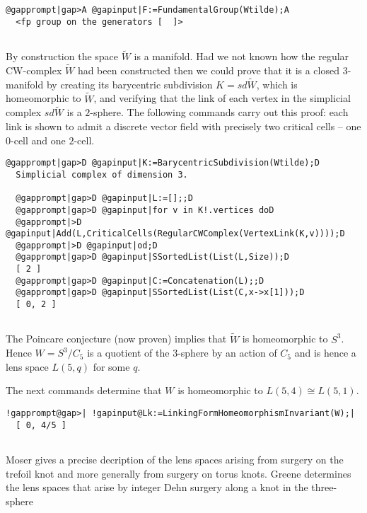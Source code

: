 \documentclass[a4paper,11pt]{report}
\begin{document}
{{\begin{Verbatim}[commandchars=@|A,fontsize=\small,frame=single,label=Example]
  @gapprompt|gap>A @gapinput|F:=FundamentalGroup(Wtilde);A
  <fp group on the generators [  ]>
  
\end{Verbatim}
 By construction the space $\widetilde W$ is a manifold. Had we not known how the regular CW-complex $\widetilde W$ had been constructed then we could prove that it is a closed $3$-manifold by creating its barycentric subdivision $K=sd\widetilde W$, which is homeomorphic to $\widetilde W$, and verifying that the link of each vertex in the simplicial complex $sd\widetilde W$ is a $2$-sphere. The following commands carry out this proof: each link is shown to
admit a discrete vector field with precisely two critical cells -- one $0$-cell and one $2$-cell. 
\begin{Verbatim}[commandchars=@|D,fontsize=\small,frame=single,label=Example]
  @gapprompt|gap>D @gapinput|K:=BarycentricSubdivision(Wtilde);D
  Simplicial complex of dimension 3.
  
  @gapprompt|gap>D @gapinput|L:=[];;D
  @gapprompt|gap>D @gapinput|for v in K!.vertices doD
  @gapprompt|>D @gapinput|Add(L,CriticalCells(RegularCWComplex(VertexLink(K,v))));D
  @gapprompt|>D @gapinput|od;D
  @gapprompt|gap>D @gapinput|SSortedList(List(L,Size));D
  [ 2 ]
  @gapprompt|gap>D @gapinput|C:=Concatenation(L);;D
  @gapprompt|gap>D @gapinput|SSortedList(List(C,x->x[1]));D
  [ 0, 2 ]
  
\end{Verbatim}
 The Poincare conjecture (now proven) implies that $\widetilde W$ is homeomorphic to $S^3$. Hence $W=S^3/C_5$ is a quotient of the $3$-sphere by an action of $C_5$ and is hence a lens space $L(5,q)$ for some $q$. 

 The next commands determine that $W$ is homeomorphic to $L(5,4)\cong L(5,1)$. 
\begin{Verbatim}[commandchars=!@|,fontsize=\small,frame=single,label=Example]
  !gapprompt@gap>| !gapinput@Lk:=LinkingFormHomeomorphismInvariant(W);|
  [ 0, 4/5 ]
  
\end{Verbatim}
 

 Moser \cite{lmoser} gives a precise decription of the lens spaces arising from surgery on the
trefoil knot and more generally from surgery on torus knots. Greene \cite{greene} determines the lens spaces that arise by integer Dehn surgery along a knot in
the three-sphere }

 
}
\end{document}
